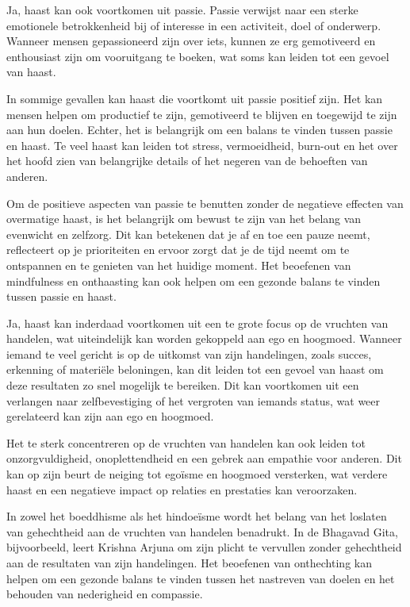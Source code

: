 Ja, haast kan ook voortkomen uit passie. Passie verwijst naar een sterke emotionele betrokkenheid bij of interesse in een activiteit, doel of onderwerp. Wanneer mensen gepassioneerd zijn over iets, kunnen ze erg gemotiveerd en enthousiast zijn om vooruitgang te boeken, wat soms kan leiden tot een gevoel van haast.

In sommige gevallen kan haast die voortkomt uit passie positief zijn. Het kan mensen helpen om productief te zijn, gemotiveerd te blijven en toegewijd te zijn aan hun doelen. Echter, het is belangrijk om een balans te vinden tussen passie en haast. Te veel haast kan leiden tot stress, vermoeidheid, burn-out en het over het hoofd zien van belangrijke details of het negeren van de behoeften van anderen.

Om de positieve aspecten van passie te benutten zonder de negatieve effecten van overmatige haast, is het belangrijk om bewust te zijn van het belang van evenwicht en zelfzorg. Dit kan betekenen dat je af en toe een pauze neemt, reflecteert op je prioriteiten en ervoor zorgt dat je de tijd neemt om te ontspannen en te genieten van het huidige moment. Het beoefenen van mindfulness en onthaasting kan ook helpen om een gezonde balans te vinden tussen passie en haast.

Ja, haast kan inderdaad voortkomen uit een te grote focus op de vruchten van handelen, wat uiteindelijk kan worden gekoppeld aan ego en hoogmoed. Wanneer iemand te veel gericht is op de uitkomst van zijn handelingen, zoals succes, erkenning of materiële beloningen, kan dit leiden tot een gevoel van haast om deze resultaten zo snel mogelijk te bereiken. Dit kan voortkomen uit een verlangen naar zelfbevestiging of het vergroten van iemands status, wat weer gerelateerd kan zijn aan ego en hoogmoed.

Het te sterk concentreren op de vruchten van handelen kan ook leiden tot onzorgvuldigheid, onoplettendheid en een gebrek aan empathie voor anderen. Dit kan op zijn beurt de neiging tot egoïsme en hoogmoed versterken, wat verdere haast en een negatieve impact op relaties en prestaties kan veroorzaken.

In zowel het boeddhisme als het hindoeïsme wordt het belang van het loslaten van gehechtheid aan de vruchten van handelen benadrukt. In de Bhagavad Gita, bijvoorbeeld, leert Krishna Arjuna om zijn plicht te vervullen zonder gehechtheid aan de resultaten van zijn handelingen. Het beoefenen van onthechting kan helpen om een gezonde balans te vinden tussen het nastreven van doelen en het behouden van nederigheid en compassie.

